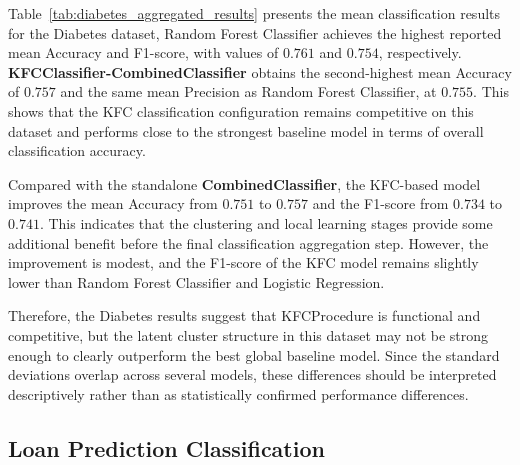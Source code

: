 \hs Table~\ref{tab:diabetes_aggregated_results} presents the mean classification results for the Diabetes dataset, Random Forest Classifier achieves the highest reported mean Accuracy and F1-score, with values of $0.761$ and $0.754$, respectively. \textbf{KFCClassifier-CombinedClassifier} obtains the second-highest mean Accuracy of $0.757$ and the same mean Precision as Random Forest Classifier, at $0.755$. This shows that the KFC classification configuration remains competitive on this dataset and performs close to the strongest baseline model in terms of overall classification accuracy.

Compared with the standalone \textbf{CombinedClassifier}, the KFC-based model improves the mean Accuracy from $0.751$ to $0.757$ and the F1-score from $0.734$ to $0.741$. This indicates that the clustering and local learning stages provide some additional benefit before the final classification aggregation step. However, the improvement is modest, and the F1-score of the KFC model remains slightly lower than Random Forest Classifier and Logistic Regression.

Therefore, the Diabetes results suggest that KFCProcedure is functional and competitive, but the latent cluster structure in this dataset may not be strong enough to clearly outperform the best global baseline model. Since the standard deviations overlap across several models, these differences should be interpreted descriptively rather than as statistically confirmed performance differences.

\subsection{Loan Prediction Classification}

